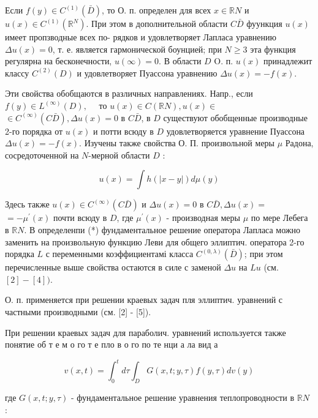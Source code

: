 \documentclass[10pt]{article}
\begin{document}
Если $f(y) \in C^{(1)}(\bar{D})$, то О. п. определен для всех $x \in \mathbb{R} N$ и $u(x) \in C^{(1)}\left(\mathbb{R}^{N}\right)$. При этом в дополнительной области $C \bar{D}$ фуункция $u(x)$ имеет пропзводные всех по- рядков и удовлетворяет Лапласа уравнению $\Delta u(x)=0$, т. е. является гармонической боунцией; при $N \geqslant 3$ эта функция регулярна на бесконечности, $u(\infty)=0$. В области $D$ O. п. $u(x)$ принадлежит классу $C^{(2)}(D)$ и удовлетворяет Пуассона уравнению $\Delta u(x)=-f(x)$.



Эти свойства обобщаются в различных направлениях. Напр., если $f(y) \in L^{(\infty)}(D), \quad$ то $u(x) \in C(\mathbb{R} N), u(x) \in$ $\in C^{(\infty)}(C \bar{D}), \Delta u(x)=0$ в $C \bar{D}$, в $D$ существуют обобщенные производные 2-го порядка от $u(x)$ и потти всюду в $D$ удовлетворяется уравнение Пуассона $\Delta u(x)=-f(x)$. Изучены также свойства О. П. произвольной меры $\mu$ Радона, сосредоточенной на $N$-мерной области $D$ :



\[

u(x)=\int h(|x-y|) d \mu(y)

\]



Здесь также $u(x) \in C^{(\infty)}(C \bar{D})$ и $\Delta u(x)=0$ в $C \bar{D}, \Delta u(x)=$ $=-\mu^{\prime}(x)$ почти всюду в $D$, где $\mu^{\prime}(x)$ - производная меры $\mu$ по мере Лебега в $\mathbb{R} N$. В определенпи (*) фундаментальное решение оператора Лапласа можно заменить на произвольную функцию Леви для общего эллиптич. оператора 2-го порядка $L$ с переменными коэффициентамі класса $C^{(0, \lambda)}(\bar{D})$; при этом перечисленные выше свойства остаются в силе с заменой $\Delta u$ на $L u$ (см. $[2]-[4])$.



О. п. применяется при решении краевых задач пля эллиптич. уравнений с частными производными (см. [2] - [5]).



При решении краевых задач для параболич. уравнений используется также понятие об т е м о го т е пло в о го по те нци а ла вид а



\[

v(x, t)=\int_{0}^{t} d \tau \int_{D} G(x, t ; y, \tau) f(y, \tau) d v(y)

\]



где $G(x, t ; y, \tau)$ - фундаментальное решение уравнения теплопроводности в $\mathbb{R} N$ :
\end{document}

